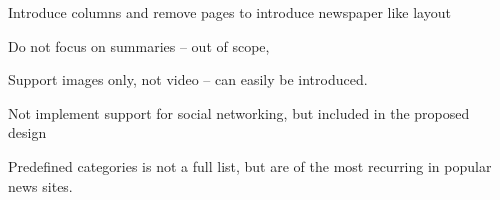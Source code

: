 Introduce columns and remove pages to introduce newspaper like layout

Do not focus on summaries -- out of scope, 

Support images only, not video -- can easily be introduced.

Not implement support for social networking, but included in the proposed design

Predefined categories is not a full list, but are of the most recurring in popular news sites.




